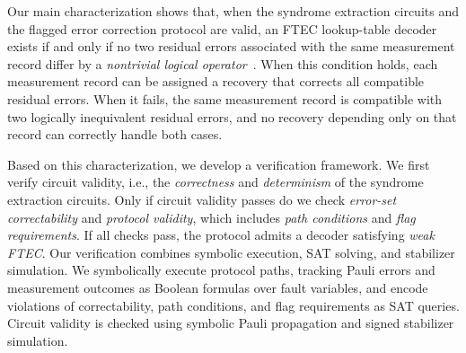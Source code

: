 \documentclass[acmsmall,screen,review,anonymous,nonacm]{acmart}
\newcommand{\showcomment}[1]{#1}
\newcommand{\yfc}[1]{\showcomment{\textcolor{blue}{\textbf{YFC:} #1}}}
\begin{document}


Our main characterization shows that, when the syndrome extraction circuits
and the flagged error correction protocol are valid, an FTEC lookup-table
decoder exists if and only if no two residual errors associated with the
same measurement record differ by a
\emph{nontrivial logical operator}~\cite{KL97,Got97}.
When this condition holds, each measurement record can be assigned a recovery that corrects
all compatible residual errors. When it fails, the same measurement record is
compatible with two logically inequivalent residual errors, and no recovery
depending only on that record can correctly handle both cases.


Based on this characterization, we develop a verification framework.
We first verify circuit validity, i.e., the \emph{correctness} and \emph{determinism} of the syndrome extraction
circuits. Only if circuit validity passes do we check \emph{error-set correctability}
and \emph{protocol validity}, which includes \emph{path conditions} %
and \emph{flag requirements}. If all checks pass, the protocol admits a decoder satisfying \emph{weak FTEC}.
Our verification combines symbolic execution, SAT solving, and
stabilizer simulation. We symbolically execute protocol paths,
tracking Pauli errors and measurement outcomes as Boolean formulas
over fault variables, and encode violations of correctability,
path conditions, and flag requirements as SAT queries.
Circuit validity is checked using symbolic Pauli propagation
and signed stabilizer simulation.

\end{document}
